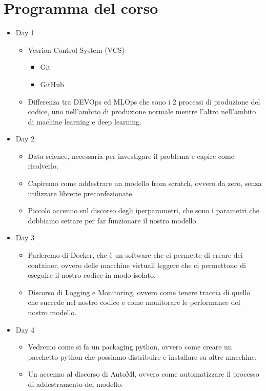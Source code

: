 \documentclass[a4paper,12pt]{article}
\begin{document}
\section{Programma del corso}
\begin{itemize}
    \item Day 1
    \begin{itemize}
        \item Vesrion Control System (VCS)
        \begin{itemize}
            \item Git
            \item GitHub
        \end{itemize}
        \item Differenza tra DEVOps ed MLOps che sono i 2 processi di produzione del codice, uno nell'ambito di produzione normale mentre l'altro nell'ambito di machine learning e deep learning.
    \end{itemize}
        \item Day 2
    \begin{itemize}
        \item Data science, necessaria per investigare il problema e capire come risolverlo.
        \item Capiremo come addestrare un modello from scratch, ovvero da zero, senza utilizzare librerie preconfezionate.
        \item Piccolo accenno sul discorso degli iperparametri, che sono i parametri che dobbiamo settare per far funzionare il nostro modello.
    \end{itemize}
        \item Day 3
        \begin{itemize}
            \item Parleremo di Docker, che è un software che ci permette di creare dei container, ovvero delle macchine virtuali leggere che ci permettono di eseguire il nostro codice in modo isolato.
            \item Discorso di Logging e Monitoring, ovvero come tenere traccia di quello che succede nel nostro codice e come monitorare le performance del nostro modello.
        \end{itemize}
        \item Day 4
        \begin{itemize}
            \item Vedremo come si fa un packaging python, ovvero come creare un pacchetto python che possiamo distribuire e installare su altre macchine.
            \item Un accenno al discorso di AutoMl, ovvero come automatizzare il processo di addestramento del modello.
        \end{itemize}
\end{itemize}
\end{document}
